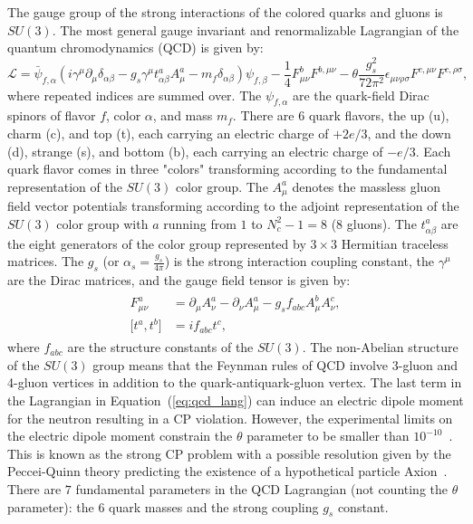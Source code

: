 The gauge group of the strong interactions of the colored quarks and gluons is $SU(3)$. The most general gauge invariant and renormalizable Lagrangian of the quantum chromodynamics (QCD) is given by:
 \begin{equation} \label{eq:qcd_lang}
\mathcal{L} =  \bar{\psi}_{f,\alpha} (i \gamma^{\mu}\partial_{\mu}\delta_{\alpha\beta}-g_{s}\gamma^{\mu}t^{a}_{\alpha\beta}A^{a}_{\mu}-m_{f}\delta_{\alpha\beta})\psi_{f,\beta}-\frac{1}{4}F_{\mu\nu}^{b}F^{b,\mu\nu}-\theta\frac{g_{s}^2}{72\pi^2}\epsilon_{\mu\nu\rho\sigma}F^{c,\mu\nu}F^{c,\rho\sigma},
\end{equation}
where repeated indices are summed over. The $\psi_{f,\alpha}$ are the quark-field Dirac spinors of flavor $f$, color $\alpha$, and mass $m_{f}$. There are $6$ quark flavors, the up (u), charm (c), and top (t), each carrying an electric charge of $+2e/3$, and the down (d), strange (s), and bottom (b), each carrying an electric charge of $-e/3$. Each quark flavor comes in three "colors" transforming according to the fundamental representation of the $SU(3)$ color group. The $A_{\mu}^{a}$ denotes the massless gluon field vector potentials transforming according to the adjoint representation of the $SU(3)$ color group with $a$ running from $1$ to $N_{c}^2-1=8$ (8 gluons).  The $t_{\alpha\beta}^{a}$ are the eight generators of the color group represented by $3 \times 3$ Hermitian traceless matrices. The $g_{s}$ (or $\alpha_{s} = \frac{g_{s}}{4\pi}$) is the strong interaction coupling constant, the $\gamma^{\mu}$ are the Dirac matrices, and the gauge field tensor is given by:
 \begin{eqnarray} \label{eq:qcd_field}
 \begin{aligned}
F_{\mu\nu}^{a} &= \partial_{\mu}A_{\nu}^a-\partial_{\nu}A_{\mu}^a-g_{s}f_{abc}A_{\mu}^{b}A_{\nu}^{c},  \\
\mathrm{[}t^a,t^b\mathrm{]} &= if_{abc}t^{c},
\end{aligned}
\end{eqnarray}
where $f_{abc}$ are the structure constants of the $SU(3)$. The non-Abelian structure of the $SU(3)$ group means that the Feynman rules of QCD involve 3-gluon and 4-gluon vertices in addition to the quark-antiquark-gluon vertex. The last term in the Lagrangian in Equation~(\ref{eq:qcd_lang}) can induce an electric dipole moment for the neutron resulting in a CP violation. However, the experimental limits on the electric dipole moment constrain the $\theta$ parameter to be smaller than $10^{-10}$~\cite{Agashe:2014kda}. This is known as the strong CP problem with a possible resolution given by the Peccei-Quinn theory predicting the existence of a hypothetical particle Axion~\cite{PhysRevLett.38.1440}. There are $7$ fundamental parameters in the QCD Lagrangian (not counting the $\theta$ parameter): the $6$ quark masses and the strong coupling $g_{s}$ constant.

